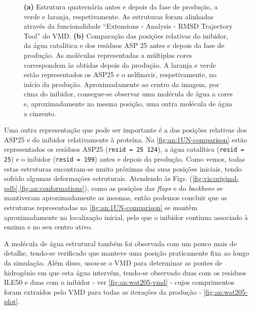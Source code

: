 \documentclass[12pt,a4paper]{article}
\begin{document}
\begin{figure}[h]
	\caption{\textbf{(a)} Estrutura quaternária antes e depois da fase de produção, a verde e laranja, respetivamente. As estruturas foram alinhadas através da funcionalidade ``Extensions - Analysis - RMSD Trajectory Tool'' do VMD. \textbf{(b)} Comparação das posições relativas do inibidor, da água catalítica e dos resíduos ASP 25 antes e depois da fase de produção. As moléculas representadas a múltiplas cores correspondem às obtidas depois da produção. A laranja e verde estão representados os ASP25 e o nelfinavir, respetivamente, no início da produção. Aproximadamente ao centro da imagem, por cima do inibidor, consegue-se observar uma molécula de água a cores e, aproximadamente na mesma posição, uma outra molécula de água a cinzento.}
	\end{figure}

	Uma outra representação que pode ser importante é a das posições relativas dos ASP25 e do inibidor relativamente à proteína. Na \cref{fig:an:1UN-comparison} estão representados os resíduos ASP25 (\verb|resid = 25 124|), a água catalítica (\verb|resid = 25|) e o inibidor (\verb|resid = 199|) antes e depois da produção. Como vemos, todas estas estruturas encontram-se muito próximas das suas posições iniciais, tendo sofrido algumas deformações estruturais. Atendendo às Figs. (\ref{fig:vis:original-pdb},\ref{fig:an:conformations}), como as posições das \textit{flaps} e do \textit{backbone} se mantiveram aproximadamente as mesmas, então podemos concluir que as estruturas representadas na \cref{fig:an:1UN-comparison} se mantêm aproximadamente na localização inicial, pelo que o inibidor continua associado à enzima e no seu centro ativo. 
	
	A molécula de água estrutural também foi observada com um pouco mais de detalhe, tendo-se verificado que manteve uma posição praticamente fixa ao longo da simulação. Além disso, usou-se o VMD para determinar as pontes de hidrogénio em que esta água intervém, tendo-se observado duas com os resíduos ILE50 e duas com o inibidor - ver \cref{fig:an:wat205-vmd} - cujos comprimentos foram extraídos pelo VMD para todas as iterações da produção - \cref{fig:an:wat205-plot}.
	
\end{document}

